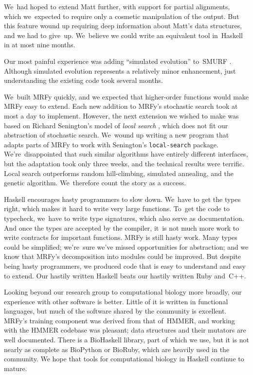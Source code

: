 \documentclass[]{jfp1}
\let\cite\citep
\begin{document}
We~had hoped to extend Matt further, with support for partial alignments,
which we~expected to require only 
a cosmetic manipulation of the 
output.
But
this feature wound up
requiring deep information about Matt's data structures,
and we had to give~up.
We~believe we could write an equivalent tool in~Haskell
in at most nine months.

Our most painful experience was adding ``simulated evolution''
to~SMURF \cite{Daniels:2012}. 
Although simulated evolution represents a relatively minor
enhancement,
just understanding the existing code took several months.

We~built MRFy quickly, and we expected that
higher-order functions would make MRFy easy to extend.
Each new addition to MRFy's stochastic search took at most a day
to implement.
However, the next extension we wished to make
was based on
Richard Senington's model of \emph{local
search} \cite{senington:combinators-local}, 
which does not fit our abstraction of stochastic search.
We~wound up writing a new program that adapts parts
of MRFy to work with Senington's  \texttt{local-search} package.
We're~disappointed that such similar algorithms have entirely
different interfaces,
but the adaptation took only three weeks, and the
technical results were terrific. 
Local search outperforms random hill-climbing, simulated
annealing, and the genetic algorithm.
We~therefore count the story as a success.




Haskell encourages hasty programmers to slow down.
We~have to get the types right,
which makes it hard to write very large functions.
To~get the code to typecheck, we~have to write type signatures, which
also serve as documentation.
And once the types are accepted by the compiler,
it~is not much more work to write contracts for important functions.
MRFy is still hasty work.
Many types could be simplified;
we're~sure we've missed opportunities for abstraction;
and we know that MRFy's decomposition into modules could be improved.
But despite being hasty programmers, we produced code 
that is easy to understand and easy to extend.
Our hastily written Haskell beats
our hastily written Ruby and~C++.


Looking beyond our research group to computational biology more
broadly, our experience with other software is better.
Little of it is written in functional languages, 
but much of the software shared by the community is excellent.
MRFy's training component was derived from that of~HMMER,
and
working with the HMMER 
codebase was pleasant;
data structures and their
mutators are well documented. 
There is a 
BioHaskell library, part of which we use,
but it is not nearly as 
complete as BioPython or BioRuby, which are heavily used in the community.
We hope that tools for computational biology in
Haskell continue to mature. 
\end{document}

